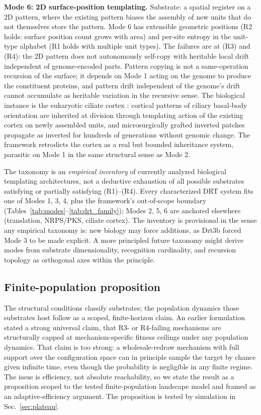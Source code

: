 \documentclass[aps,prx,reprint,amsmath,amssymb,floatfix,superscriptaddress,nofootinbib]{revtex4-2}
\theoremstyle{plain-thm}
\theoremstyle{definition-thm}
\begin{document}
\textbf{Mode 6: 2D surface-position templating.} Substrate: a spatial register on a 2D pattern, where the existing pattern biases the assembly of new units that do not themselves store the pattern. Mode 6 has extensible geometric positions (R2 holds: surface position count grows with area) and per-site entropy in the unit-type alphabet (R1 holds with multiple unit types). The failures are at (R3) and (R4): the 2D pattern does not autonomously self-copy with heritable local drift independent of genome-encoded parts. Pattern copying is not a same-operation recursion of the surface; it depends on Mode 1 acting on the genome to produce the constituent proteins, and pattern drift independent of the genome's drift cannot accumulate as heritable variation in the recursive sense. The biological instance is the eukaryotic ciliate cortex \citep{BeissonSonneborn1965, Frankel1989}: cortical patterns of ciliary basal-body orientation are inherited at division through templating action of the existing cortex on newly assembled units, and microsurgically grafted inverted patches propagate as inverted for hundreds of generations without genomic change. The framework retrodicts the cortex as a real but bounded inheritance system, parasitic on Mode 1 in the same structural sense as Mode 2.

The taxonomy is an \emph{empirical inventory} of currently analyzed biological templating architectures, not a deductive exhaustion of all possible substrates satisfying or partially satisfying (R1)--(R4). Every characterized DRT system fits one of Modes 1, 3, 4, plus the framework's out-of-scope boundary (Tables~\ref{tab:modes}--\ref{tab:drt_family}); Modes 2, 5, 6 are anchored elsewhere (translation, NRPS/PKS, ciliate cortex). The inventory is provisional in the sense any empirical taxonomy is: new biology may force additions, as Drt3b forced Mode 3 to be made explicit. A more principled future taxonomy might derive modes from substrate dimensionality, recognition cardinality, and recursion topology as orthogonal axes within the principle.

\subsection{Finite-population proposition}
\label{sec:proposition}

The structural conditions classify substrates; the population dynamics those substrates host follow as a scoped, finite-horizon claim. An earlier formulation stated a strong universal claim, that R3- or R4-failing mechanisms are structurally capped at mechanism-specific fitness ceilings under any population dynamics. That claim is too strong: a wholesale-redraw mechanism with full support over the configuration space can in principle sample the target by chance given infinite time, even though the probability is negligible in any finite regime. The issue is efficiency, not absolute reachability, so we state the result as a proposition scoped to the tested finite-population landscape model and framed as an adaptive-efficiency argument. The proposition is tested by simulation in Sec.~\ref{sec:plateau}.
\end{document}
